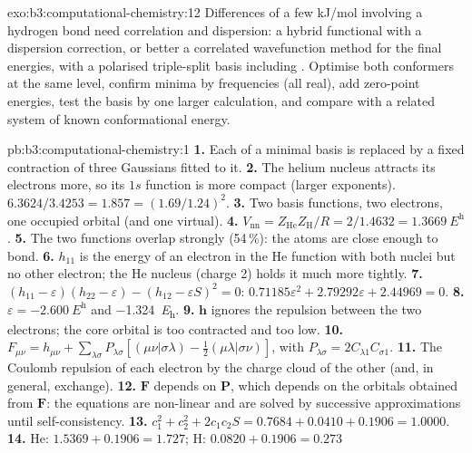 \begin{solution}{exo:b3:computational-chemistry:12}
Differences of a few \unit{kJ/mol} involving a hydrogen bond need correlation and
dispersion: a hybrid functional with a dispersion correction, or better a
correlated wavefunction method for the final energies, with a polarised
triple-split basis including . Optimise both conformers at
the same level, confirm minima by frequencies (all real), add zero-point
energies, test the basis by one larger calculation, and compare with a
related system of known conformational energy.
\end{solution}

\begin{solution}{pb:b3:computational-chemistry:1}
\textbf{1.} Each  of a minimal basis is replaced by a fixed
contraction of three Gaussians fitted to it.
\textbf{2.} The helium nucleus attracts its electrons more, so its $1s$ function
is more compact (larger exponents). $6.3624/3.4253 = 1.857 = (1.69/1.24)^2$.
\textbf{3.} Two basis functions, two electrons, one occupied orbital (and one
virtual).
\textbf{4.} $V_{\mathrm{nn}} = Z_{\mathrm{He}}Z_{\mathrm H}/R = 2/1.4632 =
\qty{1.3669}{\hartree}$.
\textbf{5.} The two functions overlap strongly (54\,\%): the atoms are close
enough to bond.
\textbf{6.} $h_{11}$ is the energy of an electron in the He function with both
nuclei but no other electron; the He nucleus (charge 2) holds it much more
tightly.
\textbf{7.} $(h_{11} - \varepsilon)(h_{22} - \varepsilon) - (h_{12} - \varepsilon S)^2 = 0$:
$0.71185\varepsilon^2 + 2.79292\varepsilon + 2.44969 = 0$.
\textbf{8.} $\varepsilon = \qty{-2.600}{\hartree}$ and \qty{-1.324}{\hartree}.
\textbf{9.} $\mathbf h$ ignores the repulsion between the two electrons; the core
orbital is too contracted and too low.
\textbf{10.} $F_{\mu\nu} = h_{\mu\nu} + \sum_{\lambda\sigma}P_{\lambda\sigma}[(\mu\nu|\sigma\lambda) -
\frac12(\mu\lambda|\sigma\nu)]$, with $P_{\lambda\sigma} = 2C_{\lambda1}C_{\sigma1}$.
\textbf{11.} The Coulomb repulsion of each electron by the charge cloud of the
other (and, in general, exchange).
\textbf{12.} $\mathbf F$ depends on $\mathbf P$, which depends on the orbitals obtained
from $\mathbf F$: the equations are non-linear and are solved by successive
approximations until self-consistency.
\textbf{13.} $c_1^2 + c_2^2 + 2c_1c_2S = 0.7684 + 0.0410 + 0.1906 = 1.0000$.
\textbf{14.} He: $1.5369 + 0.1906 = 1.727$; H: $0.0820 + 0.1906 = 0.273$

\end{solution}
